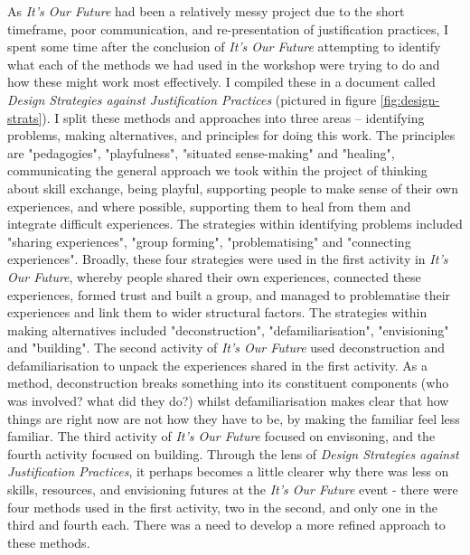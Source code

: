 As \textit{It's Our Future} had been a relatively messy project due to the short timeframe, poor communication, and re-presentation of justification practices, I spent some time after the conclusion of \textit{It's Our Future} attempting to identify what each of the methods we had used in the workshop were trying to do and how these might work most effectively. I compiled these in a document called \textit{Design Strategies against Justification Practices} (pictured in figure \ref{fig:design-strats}). I split these methods and approaches into three areas – identifying problems, making alternatives, and principles for doing this work. The principles are "pedagogies", "playfulness", "situated sense-making" and "healing", communicating the general approach we took within the project of thinking about skill exchange, being playful, supporting people to make sense of their own experiences, and where possible, supporting them to heal from them and integrate difficult experiences. The strategies within identifying problems included "sharing experiences", "group forming", "problematising" and "connecting experiences". Broadly, these four strategies were used in the first activity in \textit{It's Our Future}, whereby people shared their own experiences, connected these experiences, formed trust and built a group, and managed to problematise their experiences and link them to wider structural factors. The strategies within making alternatives included "deconstruction", "defamiliarisation", "envisioning" and "building". The second activity of \textit{It's Our Future} used deconstruction and defamiliarisation to unpack the experiences shared in the first activity. As a method, deconstruction breaks something into its constituent components (who was involved? what did they do?) whilst defamiliarisation makes clear that how things are right now are not how they have to be, by making the familiar feel less familiar. The third activity of \textit{It's Our Future} focused on envisoning, and the fourth activity focused on building. Through the lens of \textit{Design Strategies against Justification Practices}, it perhaps becomes a little clearer why there was less on skills, resources, and envisioning futures at the \textit{It's Our Future} event - there were four methods used in the first activity, two in the second, and only one in the third and fourth each. There was a need to develop a more refined approach to these methods. 

